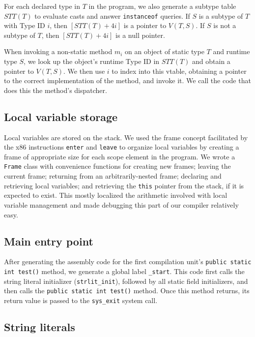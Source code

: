 \documentclass[12pt]{article}
\newcommand{\code}[1]{\texttt{#1}}
\begin{document}
For each declared type in $T$ in the program, we also generate a subtype table $STT(T)$ to evaluate casts and answer \code{instanceof} queries. If $S$ is a subtype of $T$ with Type ID $i$, then $[STT(T)+4i]$ is a pointer to $V(T,S)$. If $S$ is not a subtype of $T$, then $[STT(T)+4i]$ is a null pointer.

When invoking a non-static method $m_i$ on an object of static type $T$ and runtime type $S$, we look up the object's runtime Type ID in $STT(T)$ and obtain a pointer to $V(T,S)$. We then use $i$ to index into this vtable, obtaining a pointer to the correct implementation of the method, and invoke it. We call the code that does this the method's dispatcher.

\subsection{Local variable storage}

Local variables are stored on the stack.  We used the frame concept facilitated by the x86 instructions \code{enter} and \code{leave} to organize local variables by creating a frame of appropriate size for each scope element in the program.  We wrote a \code{Frame} class with convenience functions for creating new frames; leaving the current frame; returning from an arbitrarily-nested frame; declaring and retrieving local variables; and retrieving the \code{this} pointer from the stack, if it is expected to exist.  This mostly localized the arithmetic involved with local variable management and made debugging this part of our compiler relatively easy.

\subsection{Main entry point}

After generating the assembly code for the first compilation unit's \code{public static int test()} method, we generate a global label \code{\_start}. This code first calls the string literal initializer (\code{strlit\_init}), followed by all static field initializers, and then calls the \code{public static int test()} method. Once this method returns, its return value is passed to the \code{sys\_exit} system call.

\subsection{String literals}
\end{document}
